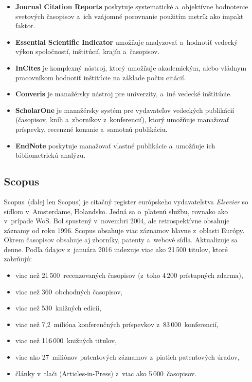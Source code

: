 \begin{itemize}
\item \textbf{Journal Citation Reports} poskytuje systematické a~objektívne
  hodnotenie svetových časopisov a~ich vzájomné porovnanie použitím metrík ako
  impakt faktor.
\item \textbf{Essential Scientific Indicator} umožňuje analyzovať a~hodnotiť
  vedecký výkon spoločností, inštitúcií, krajín a~časopisov.
\item \textbf{InCites} je komplexný nástroj, ktorý umožňuje akademickým, alebo
  vládnym pracovníkom hodnotiť inštitúcie na základe počtu citácií.
\item \textbf{Converis} je manažérsky nástroj pre univerzity, a~iné vedecké
  inštitúcie.
\item \textbf{ScholarOne} je manažérsky systém pre vydavateľov vedeckých
  publikácií (časopisov, kníh a~zborníkov z~konferencií), ktorý umožňuje
  manažovať príspevky, recenzné konanie a~samotnú publikáciu.
\item \textbf{EndNote} poskytuje manažovať vlastné publikácie a~umožňuje ich
  bibliometrickú analýzu.
\end{itemize}


\subsection{Scopus}
\label{sec:scopus}

Scopus\R\ (ďalej len Scopus) je citačný register európskeho vydavateľstva \emph{Elsevier} so
sídlom v~Amsterdame, Holandsko.  Jedná sa o~platenú službu, rovnako ako v~prípade WoS.
Bol spustený v~novembri 2004, ale retrospektívne obsahuje záznamy od roku 1996.
Scopus obsahuje viac záznamov hlavne z~oblasti Európy.  Okrem časopisov obsahuje
aj zborníky, patenty a~webové sídla.  Aktualizuje sa denne.  Podľa údajov
z~januára 2016 indexuje viac ako 21\,500 titulov, ktoré zahrňujú:

\begin{itemize}
\item viac než 21\,500~recenzovaných časopisov (z~toho 4\,200 prístupných
  zdarma),
\item viac než 360~obchodných časopisov,
\item viac než 530~knižných edícií,
\item viac než 7,2~milióna konferenčných príspevkov z~83\,000~konferencií,
\item viac než 116\,000~knižných titulov,
\item viac ako 27~miliónov patentových záznamov z~piatich patentových úradov,
\item články v~tlači (Articles-in-Press) z~viac ako 5\,000~časopisov.
\end{itemize}

